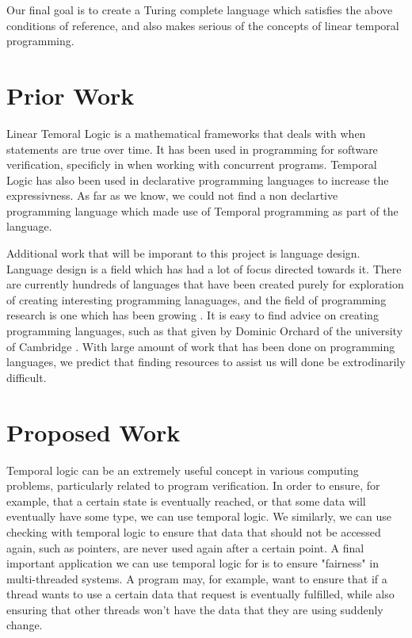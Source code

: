 \documentclass[numbers]{sigplanconf}
\begin{document}
Our final goal is to create a Turing complete language which satisfies
the above conditions of reference, and also makes serious of the
concepts of linear temporal programming.

\section{Prior Work}
 

Linear Temoral Logic is a mathematical frameworks that deals with when
statements are true over time. It has been used in programming for
software verification, specificly in when working with concurrent
programs\cite{AutomaticVerification, SimpleVerification}. Temporal
Logic has also been used in declarative programming languages to
increase the expressivness\cite{DeclarativeTemporal}. As far as we
know, we could not find a non declartive programming language which
made use of Temporal programming as part of the language. 

Additional work that will be imporant to this project is language design.
Language design is a field which has had a lot of focus directed
towards it. There are currently hundreds of languages that
have been created purely for exploration of creating interesting
programming lanaguages, and the field of programming research is one
which has been growing \cite{esolang}. It is easy to find advice on
creating programming languages, such as that given by Dominic Orchard
of the university of Cambridge \cite{4Rs}.  With large amount of work
that has been done on programming languages, we predict that finding
resources to assist us will done be extrodinarily difficult.

\section{Proposed Work}
Temporal logic can be an extremely useful concept in various 
computing problems, particularly related to program verification. 
In order to ensure, for example, that a certain state is eventually
reached, or that some data will eventually have some type, we can use
temporal logic. We similarly, we can use checking with temporal logic to
 ensure that data that should not be accessed again, such as pointers,
 are never used again after a certain point. A final important 
 application we can use temporal logic for is to ensure "fairness" in
 multi-threaded systems. A program may, for example, want to ensure 
 that if a thread wants to use a certain data that request is
 eventually fulfilled, while also ensuring that other threads won't
 have the data that they are using suddenly change.
\end{document}

